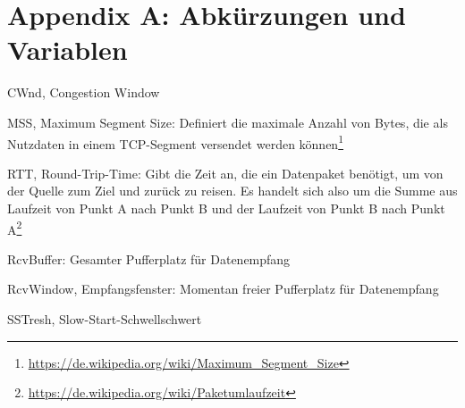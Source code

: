\section{Appendix A: Abkürzungen und Variablen}
\begin{description}
	\item{CWnd, Congestion Window}
	\item{MSS, Maximum Segment Size}: Definiert die maximale Anzahl von Bytes, die als Nutzdaten in einem TCP-Segment versendet werden können\footnote{\url{https://de.wikipedia.org/wiki/Maximum\_Segment\_Size}}
	\item{RTT, Round-Trip-Time}: Gibt die Zeit an, die ein Datenpaket benötigt, um von der Quelle zum Ziel und zurück zu reisen. Es handelt sich also um die Summe aus Laufzeit von Punkt A nach Punkt B und der Laufzeit von Punkt B nach Punkt A\footnote{\url{https://de.wikipedia.org/wiki/Paketumlaufzeit}}
	\item{RcvBuffer}: Gesamter Pufferplatz für Datenempfang
	\item{RcvWindow, Empfangsfenster}: Momentan freier Pufferplatz für Datenempfang
	\item{SSTresh, Slow-Start-Schwellschwert}
\end{description}